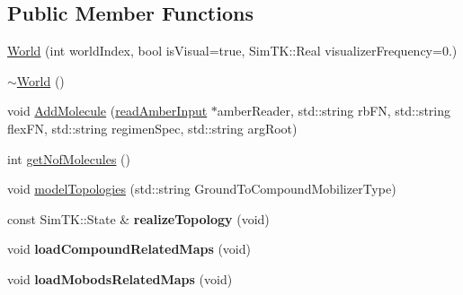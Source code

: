 \subsection*{Public Member Functions}
\begin{DoxyCompactItemize}
\item 
\hyperlink{classWorld_a5ce131833831520888e5bf6e75526438}{World} (int world\+Index, bool is\+Visual=true, Sim\+T\+K\+::\+Real visualizer\+Frequency=0.)
\item 
\hyperlink{classWorld_a8c73fba541a5817fff65147ba47cd827}{$\sim$\+World} ()
\item 
void \hyperlink{classWorld_aa71c8ba6b3fa1c580163cc144decf4a0}{Add\+Molecule} (\hyperlink{classreadAmberInput}{read\+Amber\+Input} $\ast$amber\+Reader, std\+::string rb\+FN, std\+::string flex\+FN, std\+::string regimen\+Spec, std\+::string arg\+Root)
\item 
int \hyperlink{classWorld_a321388cc18359edab1f99573188fb973}{get\+Nof\+Molecules} ()
\item 
void \hyperlink{classWorld_ab197cd25a9a29e785d329e31b6c5a2c3}{model\+Topologies} (std\+::string Ground\+To\+Compound\+Mobilizer\+Type)
\item 
const Sim\+T\+K\+::\+State \& {\bfseries realize\+Topology} (void)\hypertarget{classWorld_a7d8f9e7e5e13a7617e9b08b41b8ef608}{}\label{classWorld_a7d8f9e7e5e13a7617e9b08b41b8ef608}

\item 
void {\bfseries load\+Compound\+Related\+Maps} (void)\hypertarget{classWorld_ae71eef1e629e38141a5d75bb08372bb1}{}\label{classWorld_ae71eef1e629e38141a5d75bb08372bb1}

\item 
void {\bfseries load\+Mobods\+Related\+Maps} (void)\hypertarget{classWorld_a82fd50ef35ef6b153916102957817a3b}{}\label{classWorld_a82fd50ef35ef6b153916102957817a3b}


\end{DoxyCompactItemize}
